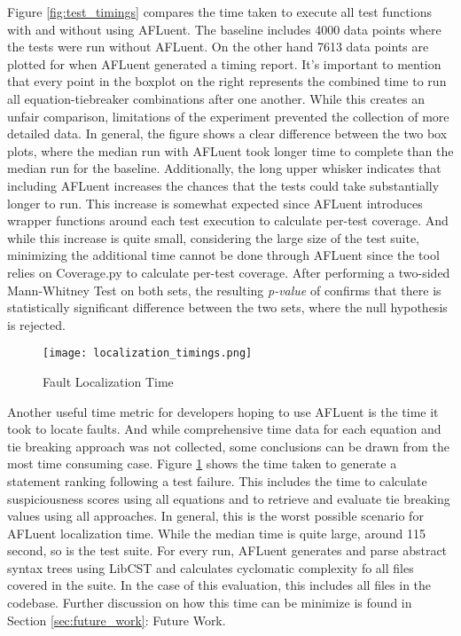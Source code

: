 Figure \ref{fig:test_timings} compares the time taken to execute all test
functions with and without using AFLuent. The baseline includes
4000 data points where the tests were run without AFLuent. On the other hand
7613 data points are plotted for when AFLuent generated a timing report. It's
important to mention that every point in the boxplot on the right represents the
combined time to run all equation-tiebreaker combinations after one another.
While this creates an unfair comparison, limitations of the experiment prevented
the collection of more detailed data.
In general, the figure shows a clear difference between the two box plots, where the median run with
AFLuent took longer time to complete than the median run for the baseline.
Additionally, the long upper whisker indicates that
including AFLuent increases the chances that the tests could take substantially
longer to run. This increase is somewhat expected since AFLuent introduces
wrapper functions around each test execution to calculate per-test coverage. And
while this increase is quite small, considering the large size of the test suite,
minimizing the additional time cannot be done through AFLuent since the tool
relies on Coverage.py to calculate per-test coverage. After performing a two-sided
Mann-Whitney Test on both sets, the resulting \emph{p-value} of
 confirms that there is statistically significant difference
between the two sets, where the null hypothesis is rejected.

\begin{figure}[!htb]
	\begin{center}
		\texttt{[image: localization\_timings.png]}
		\caption{\label{fig:localization_timings} Fault Localization Time}
	\end{center}
\end{figure}

Another useful time metric for developers hoping to use AFLuent is the time it
took to locate faults. And while
comprehensive time data for each equation and tie breaking approach was not
collected, some conclusions can be drawn from the most time consuming case.
Figure \ref{fig:localization_timings} shows the time taken to generate a
statement ranking following a test failure. This includes the time to calculate
suspiciousness scores using all equations and to retrieve and evaluate tie
breaking values using all approaches. In general, this is the worst possible
scenario for AFLuent localization time. While the median time is quite large,
around 115 second, so is the test suite. For every run, AFLuent generates and parse
abstract syntax trees using LibCST  and calculates cyclomatic complexity fo all
files covered in the suite. In the case of this evaluation, this includes all
files in the codebase. Further discussion on how this time can be minimize is
found in Section \ref{sec:future_work}: Future Work.

